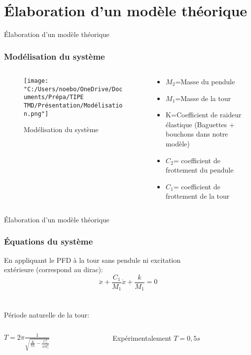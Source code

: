 \documentclass{beamer}
\begin{document}
	
	
	
	
	\section{Élaboration d'un modèle théorique}
	\begin{frame}{Élaboration d'un modèle théorique}
		\frametitle{Modélisation du système}
		
		\begin{columns}
			\begin{column}{0.5\textwidth}
				\begin{figure}
					\centering
					\texttt{[image: "C:/Users/noebo/OneDrive/Documents/Prépa/TIPE TMD/Présentation/Modélisation.png"]}
					\caption{Modélisation du système}
				\end{figure}
			\end{column}
			\begin{column}{0.5\textwidth}
				\begin{itemize}
					\item $M_{2}$=Masse du pendule
					\item $M_{1}$=Masse de la tour
					\item K=Coefficient de raideur élastique (Baguettes + bouchons dans notre modèle)
					\item $C_{2}$= coefficient de frottement du pendule 
					\item $C_{1}$= coefficient de frottement de la tour
				\end{itemize}	
			\end{column}
		\end{columns}
		
	\end{frame}
	
	\begin{frame}{Élaboration d'un modèle théorique}
		\frametitle{Équations du système}	
		En appliquant le PFD à la tour sans pendule ni excitation\\ extérieure (correspond au dirac):
		\begin{equation}\label{key}
			\ddot{x} + \frac{C_{1}}{M_{1}}\dot{x}   +  \frac{k}{M_{1}} = 0
		\end{equation}\\
	\vspace{12pt}\\
		Période naturelle de la tour:\vspace{12pt} \\
		\begin{columns}
		\begin{column}{0.5\textwidth}
				$ T = 2\pi\frac{1}{\sqrt{\frac{K}{M_{1}}-\frac{C_{1}^2}{4M_{1}^2}}}$
		\end{column}
		\begin{column}{0.5\textwidth}
		 Expérimentalement $T= 0,5 s$
		\end{column}
	\end{columns}
	

		
	\end{frame}
	
\end{document}
